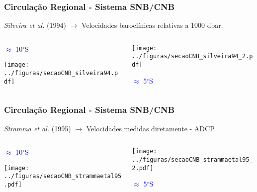 \documentclass[pdftex]{beamer}
\begin{document}
\frame
{
  \frametitle{Circulação Regional - Sistema SNB/CNB}
{\small {\it Silveira et al.} (1994) $\rightarrow$ Velocidades baroclínicas relativas a 1000 dbar.}
\begin{columns}
  \begin{column}{7cm}
\vspace{0.5cm} 
      \hspace{2.5cm} \textcolor{blue}{$\approx$ 10$^\circ$S}
\vspace{-0.5cm}
      \begin{flushleft}
        \texttt{[image: ../figuras/secaoCNB\_silveira94.pdf]}
      \end{flushleft}    
  \end{column}
  \begin{column}{6cm}
     \begin{flushright}
       \hspace{-2cm}\texttt{[image: ../figuras/secaoCNB\_silveira94\_2.pdf]}
     \end{flushright}
      \hspace{2.1cm} \textcolor{blue}{$\approx$ 5$^\circ$S}    
\vspace{1.5cm}

  \end{column}
\end{columns}

}


\frame
{
  \frametitle{Circulação Regional - Sistema SNB/CNB}
{\small {\it Stramma et al.} (1995) $\rightarrow$ Velocidades medidas diretamente - ADCP.}
\vspace{0.5cm}
\begin{columns}
  \begin{column}{6cm}
\vspace{1.5cm} 
      \textcolor{blue}{$\approx$ 10$^\circ$S}
\vspace{-2cm}
      \begin{flushleft}
        \texttt{[image: ../figuras/secaoCNB\_strammaetal95.pdf]}
      \end{flushleft}    
\vspace{-3cm}
  \end{column}
  \begin{column}{5cm}
     \begin{flushright}
       \hspace{-2cm}\texttt{[image: ../figuras/secaoCNB\_strammaetal95\_2.pdf]}
     \end{flushright}
\vspace{-0.3cm}
      \hspace{3.5cm} \textcolor{blue}{$\approx$ 5$^\circ$S}    
\vspace{1.5cm}

  \end{column}
\end{columns}

}
\end{document}
